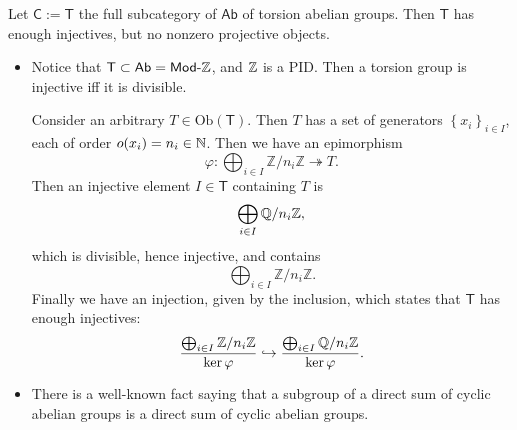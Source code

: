 \begin{ex}
	Let $\mathsf{C} := \mathsf{T}$ the full subcategory of $\mathsf{Ab}$ of torsion abelian groups.
	Then $\mathsf{T}$ has enough injectives, but no nonzero projective objects.
	\begin{itemize}
		\item Notice that $\mathsf{T} \subset \mathsf{Ab} = \mathsf{Mod}\text{-}\mathbb{Z}$,
			and $\mathbb{Z}$ is a PID.
			Then a torsion group is injective iff it is divisible.

			Consider an arbitrary $T \in \mathrm{Ob} \left(\mathsf{T}\right)$.
			Then $T$ has a set of generators $\left\{ x_i \right\}_{i \in I}$, each of order
			$o(x_i) = n_i \in \mathbb{N}$.
			Then we have an epimorphism
			\begin{equation}
			\varphi: \bigoplus_{i \in I} \mathbb{Z}/n_i\mathbb{Z} \twoheadrightarrow T
			.\end{equation} 
			Then an injective element $I \in \mathsf{T}$ containing $T$ is
			\begin{equation}
			\bigoplus_{i \in I} \mathbb{Q}/n_i \mathbb{Z}
			,\end{equation} 
			which is divisible, hence injective, and contains
			\begin{equation}
			\bigoplus_{i \in I} \mathbb{Z}/n_i\mathbb{Z}
			.\end{equation} 
			Finally we have an injection, given by the inclusion, which 
			states that $\mathsf{T}$ has enough injectives:
			\begin{equation}
			\frac{\bigoplus_{i \in I} \mathbb{Z}/n_i\mathbb{Z}}{\ker \varphi} \hookrightarrow 
			\frac{\bigoplus_{i \in I} \mathbb{Q}/n_i\mathbb{Z}}{\ker \varphi}
			.\end{equation} 
		\item There is a well-known fact saying that a subgroup of a direct sum
			of cyclic abelian groups is a direct sum of cyclic abelian groups.


\end{itemize}
\end{ex}
